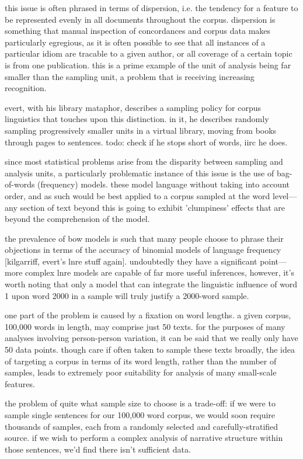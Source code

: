 this issue is often phrased in terms of dispersion, i.e. the tendency for a feature to be represented evenly in all documents throughout the corpus.  dispersion is something that manual inspection of concordances and corpus data makes particularly egregious, as it is often possible to see that all instances of a particular idiom are tracable to a given author, or all coverage of a certain topic is from one publication.  this is a prime example of the unit of analysis being far smaller than the sampling unit, a problem that is receiving increasing recognition.

evert, with his library mataphor, describes a sampling policy for corpus linguistics that touches upon this distinction.  in it, he describes randomly sampling progressively smaller units in a virtual library, moving from books through pages to sentences.  todo: check if he stops short of words, iirc he does.

since most statistical problems arise from the disparity between sampling and analysis units, a particularly problematic instance of this issue is the use of bag-of-words (frequency) models.  these model language without taking into account order, and as such would be best applied to a corpus sampled at the word level---any section of text beyond this is going to exhibit 'clumpiness' effects that are beyond the comprehension of the model.

the prevalence of bow models is such that many people choose to phrase their objections in terms of the accuracy of binomial models of language frequency [kilgarriff, evert's lnre stuff again].  undoubtedly they have a significant point---more complex lnre models are capable of far more useful inferences, however, it's worth noting that only a model that can integrate the linguistic influence of word 1 upon word 2000 in a sample will truly justify a 2000-word sample.


one part of the problem is caused by a fixation on word lengths.  a given corpus, 100,000 words in length, may comprise just 50 texts.  for the purposes of many analyses involving person-person variation, it can be said that we really only have 50 data points.  though care if often taken to sample these texts broadly, the idea of targeting a corpus in terms of its word length, rather than the number of samples, leads to extremely poor suitability for analysis of many small-scale features.

the problem of quite what sample size to choose is a trade-off: if we were to sample single sentences for our 100,000 word corpus, we would soon require thousands of samples, each from a randomly selected and carefully-stratified source.  if we wish to perform a complex analysis of narrative structure within those sentences, we'd find there isn't sufficient data.

